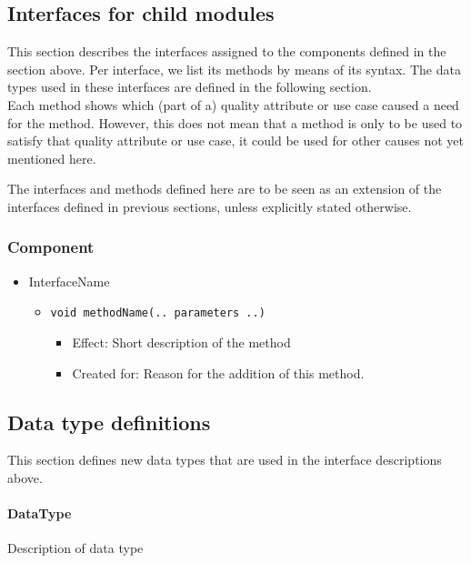 \subsection{Interfaces for child modules}\label{add2-interfaces}
    This section describes the interfaces assigned to the components defined
    in the section above. Per interface, we list its methods by means of its
    syntax. The data types used in these interfaces are defined in the following section. \\

    Each method shows which (part of a) quality attribute or use case caused
    a need for the method. However, this does not mean that a method is
    only to be used to satisfy that quality  attribute or use case, it could
    be used for other causes not yet mentioned here.

    The interfaces and methods defined here are to be seen as an
    extension of the interfaces defined in previous sections, unless
    explicitly stated otherwise.

    \subsubsection{Component}
        \begin{itemize}
            \item InterfaceName
            \begin{itemize}
                \item \texttt{void methodName(.. parameters ..)}
                \begin{itemize}
                    \item Effect: Short description of the method
                    \item Created for: Reason for the addition of this method.
                \end{itemize}
            \end{itemize}
        \end{itemize}

\subsection{Data type definitions}
    This section defines new data types that are used in the interface descriptions above.

    \paragraph{DataType}
        Description of data type
